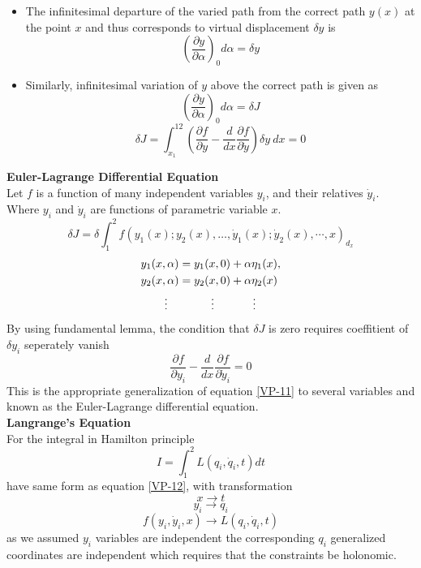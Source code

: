 	\begin{itemize}
		\item The infinitesimal departure of the varied path from the correct path $y(x)$ at the point $x$ and thus corresponds to virtual displacement $\delta y$ is
		$$\left( \frac{\partial y}{\partial\alpha}\right)_0 d\alpha=\delta y$$
\item Similarly, infinitesimal variation of $y$ above the correct path is given as		
		$$\left( \frac{\partial y}{\partial\alpha}\right)_0 d\alpha=\delta J$$
		$$\delta J=\int_{x_{1}}^{12}\left(\frac{\partial f}{\partial y}-\frac{d}{d x} \frac{\partial f}{\partial \dot{y}}\right)\delta y\ dx=0$$
	\end{itemize}
\textbf{Euler-Lagrange Differential Equation}\\
Let $f$ is a function of many independent variables $y_i$, and their relatives $\dot{y}_i$. Where $y_i$ and $\dot{y}_i$ are functions of parametric variable $x$.
\begin{equation}
\delta J=\delta \int_{1}^{2} f\left(y_{1}(x) ; y_{2}(x), \ldots, \dot{y}_{1}(x) ; \dot{y}_{2}(x), \cdots, x\right)_{d_{x}}\label{VP-12}
\end{equation}
\begin{align*}
y_{1}(x, \alpha)&=y_{1}(x, 0)+\alpha \eta_{1}(x),\\
y_{2}(x, \alpha)&=y_{2}(x, 0)+\alpha \eta_{2}(x)\\
\vdots\quad&\hspace{1cm}\vdots\hspace{1.2cm}\vdots
\end{align*}
By using fundamental lemma, the condition that $\delta J$ is zero requires coeffitient of $\delta y_i$ seperately vanish
\begin{equation}
\frac{\partial f}{\partial y_{i}}-\frac{d}{d x} \frac{\partial f}{\partial \dot{y}_{i}}=0\label{VP-13}
\end{equation}
This is the appropriate generalization of equation \ref{VP-11} to several variables and known as the Euler-Lagrange differential equation.\\
\textbf{Langrange's Equation}\\
For the integral in Hamilton principle
$$I=\int_{1}^{2} L\left(q_{i}, \dot{q}_{i}, t\right) d t$$
have same form as equation \ref{VP-12}, with transformation 
$$x\rightarrow t$$
$$y_i\rightarrow q_i$$
$$f(y_i,\dot{y}_i,x)\rightarrow L(q_i,\dot{q}_i,t)$$
as we assumed $y_i$ variables are independent the corresponding $q_i$ generalized coordinates are independent which requires that the constraints be holonomic.\\
